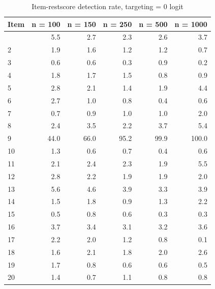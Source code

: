 \documentclass[
  letterpaper,
  DIV=11,
  numbers=noendperiod]{scrartcl}
\begin{document}
\begin{longtable}[]{@{}lrrrrr@{}}

\caption{\label{tbl-irresults0}Item-restscore detection rate, targeting
= 0 logit}

\tabularnewline

\toprule\noalign{}
Item & n = 100 & n = 150 & n = 250 & n = 500 & n = 1000 \\
\midrule\noalign{}
\endhead
\bottomrule\noalign{}
\endlastfoot
1 & 5.5 & 2.7 & 2.3 & 2.6 & 3.7 \\
2 & 1.9 & 1.6 & 1.2 & 1.2 & 0.7 \\
3 & 0.6 & 0.6 & 0.3 & 0.9 & 0.2 \\
4 & 1.8 & 1.7 & 1.5 & 0.8 & 0.9 \\
5 & 2.8 & 2.1 & 1.4 & 1.9 & 4.4 \\
6 & 2.7 & 1.0 & 0.8 & 0.4 & 0.6 \\
7 & 0.7 & 0.9 & 1.0 & 1.0 & 2.0 \\
8 & 2.4 & 3.5 & 2.2 & 3.7 & 5.4 \\
9 & 44.0 & 66.0 & 95.2 & 99.9 & 100.0 \\
10 & 1.3 & 0.6 & 0.7 & 0.4 & 0.6 \\
11 & 2.1 & 2.4 & 2.3 & 1.9 & 5.5 \\
12 & 2.8 & 2.2 & 1.9 & 1.9 & 2.0 \\
13 & 5.6 & 4.6 & 3.9 & 3.3 & 3.9 \\
14 & 1.5 & 1.8 & 0.9 & 1.3 & 2.2 \\
15 & 0.5 & 0.8 & 0.6 & 0.3 & 0.3 \\
16 & 3.7 & 3.4 & 3.1 & 3.2 & 3.6 \\
17 & 2.2 & 2.0 & 1.2 & 0.8 & 0.1 \\
18 & 1.6 & 2.1 & 1.8 & 2.0 & 2.6 \\
19 & 1.7 & 0.8 & 0.6 & 0.6 & 0.5 \\
20 & 1.4 & 0.7 & 1.1 & 0.8 & 0.8 \\

\end{longtable}
\end{document}
